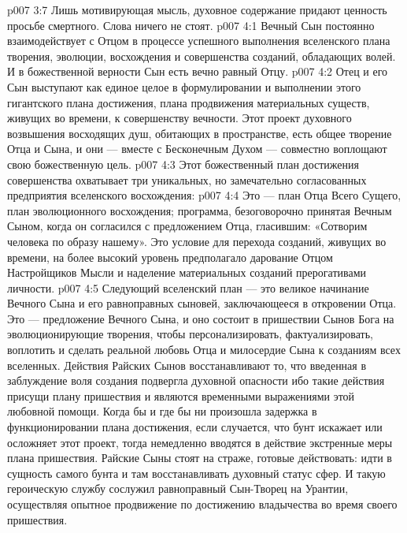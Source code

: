\vs p007 3:7 Лишь мотивирующая мысль, духовное содержание придают ценность просьбе смертного. Слова ничего не стоят.
\vs p007 4:1 Вечный Сын постоянно взаимодействует с Отцом в процессе успешного выполнения  вселенского плана творения, эволюции, восхождения и совершенства созданий, обладающих волей. И в божественной верности Сын есть вечно равный Отцу.
\vs p007 4:2 Отец и его Сын выступают как единое целое в формулировании и выполнении этого гигантского плана достижения, плана продвижения материальных существ, живущих во времени, к совершенству вечности. Этот проект духовного возвышения восходящих душ, обитающих в пространстве, есть общее творение Отца и Сына, и они --- вместе с Бесконечным Духом --- совместно воплощают свою божественную цель.
\vs p007 4:3 \pc Этот божественный план достижения совершенства охватывает три уникальных, но замечательно согласованных предприятия вселенского восхождения:
\vs p007 4:4 \pc {}\bibnobreakspace {} Это --- план Отца Всего Сущего, план эволюционного восхождения; программа, безоговорочно принятая Вечным Сыном, когда он согласился с предложением Отца, гласившим: «Сотворим человека по образу нашему». Это условие для перехода созданий, живущих во времени, на более высокий уровень предполагало дарование Отцом Настройщиков Мысли и наделение материальных созданий прерогативами личности.
\vs p007 4:5 \pc {}\bibnobreakspace {} Следующий вселенский план --- это великое начинание Вечного Сына и его равноправных сыновей, заключающееся в откровении Отца. Это --- предложение Вечного Сына, и оно состоит в пришествии Сынов Бога на эволюционирующие творения, чтобы персонализировать, фактуализировать, воплотить и сделать реальной любовь Отца и милосердие Сына к созданиям всех вселенных. Действия Райских Сынов восстанавливают то, что введенная в заблуждение воля создания подвергла духовной опасности ибо такие действия присущи плану пришествия и являются временными выражениями этой любовной помощи. Когда бы и где бы ни произошла задержка в функционировании плана достижения, если случается, что бунт искажает или осложняет этот проект, тогда немедленно вводятся в действие экстренные меры плана пришествия. Райские Сыны стоят на страже, готовые действовать: идти в сущность самого бунта и там восстанавливать духовный статус сфер. И такую героическую службу сослужил равноправный Сын\hyp{}Творец на Урантии, осуществляя опытное продвижение по достижению владычества во время своего пришествия.
